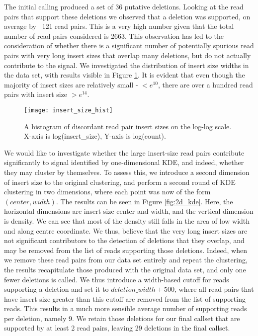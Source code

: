 The initial calling produced a set of 36 putative deletions. Looking at the read pairs that support these deletions we observed that a deletion was supported, on average by ~121 read pairs. This is a very high number given that the total number of read pairs considered is 2663. This observation has led to the consideration of whether there is a significant number of potentially spurious read pairs with very long insert sizes that overlap many deletions, but do not actually contribute to the signal. We investigated the distribution of insert size widths in the data set, with results visible in Figure \ref{fig:insert_size_hist}. It is evident that even though the majority of insert sizes are relatively small - $< e^{10}$, there are over a hundred read pairs with insert size $> e^{14}$.

\begin{figure}[h!]
    \texttt{[image: insert\_size\_hist]}
    \centering
    \caption {A histogram of discordant read pair insert sizes on the log-log scale. X-axis is log(insert\_size), Y-axis is log(count).}
    \label{fig:insert_size_hist}
\end{figure}

We would like to investigate whether the large insert-size read pairs contribute significantly to signal identified by one-dimensional KDE, and indeed, whether they may cluster by themselves. To assess this, we introduce a second dimension of insert size to the original clustering, and perform a second round of KDE clustering in two dimensions, where each point was now of the form $(center, width)$. The results can be seen in Figure \ref{fig:2d_kde}. Here, the horizontal dimensions are insert size center and width, and the vertical dimension is density. We can see that most of the density still falls in the area of low width and along centre coordinate. We thus, believe that the very long insert sizes are not significant contributors to the detection of deletions that they overlap, and may be removed from the list of reads supporting those deletions. Indeed, when we remove these read pairs from our data set entirely and repeat the clustering, the results recapitulate those produced with the original data set, and only one fewer deletions is called. We thus introduce a width-based cutoff for reads supporting a deletion and set it to $deletion\_width + 500$, where all read pairs that have insert size greater than this cutoff are removed from the list of supporting reads. This results in a much more sensible average number of supporting reads per deletion, namely 9. We retain those deletions for our final callset that are supported by at least 2 read pairs, leaving 29 deletions in the final callset.

